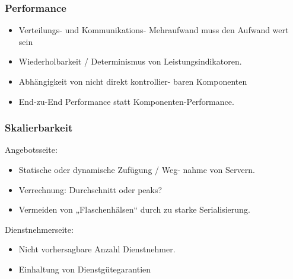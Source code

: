 \documentclass[a4paper, 10pt]{article}
\begin{document}
\subsubsection{Performance}
\begin{itemize}
	\item Verteilungs- und Kommunikations- Mehraufwand muss den Aufwand wert sein
	\item Wiederholbarkeit / Determinismus von Leistungsindikatoren.
	\item Abh\"angigkeit von nicht direkt kontrollier- baren Komponenten
	\item End-zu-End Performance statt Komponenten-Performance.
\end{itemize}

\subsubsection{Skalierbarkeit}
Angebotsseite:
\begin{itemize}
	\item Statische oder dynamische Zuf\"ugung / Weg- nahme von Servern.
	\item Verrechnung: Durchschnitt oder peaks?
	\item Vermeiden von „Flaschenh\"alsen“ durch zu starke Serialisierung.
\end{itemize}
Dienstnehmerseite:
\begin{itemize}
	\item Nicht vorhersagbare Anzahl Dienstnehmer.
	\item Einhaltung von Dienstg\"utegarantien
\end{itemize}
\end{document}
